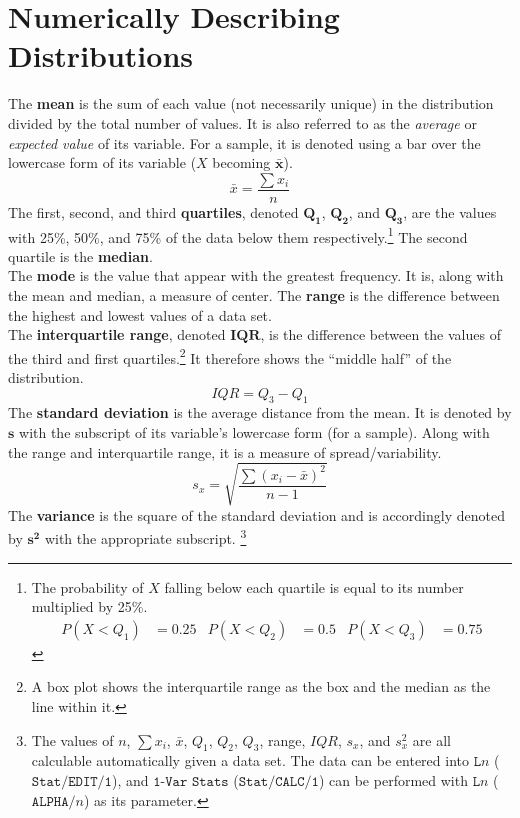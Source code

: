 \documentclass[../AP_Statistics.tex]{subfiles}
\begin{document}
		\section{Numerically Describing Distributions}
			The \textbf{mean} is the sum of each value (not necessarily unique) in the distribution divided by the total number of values. It is also referred to as the \emph{average} or \emph{expected value} of its variable. For a sample, it is denoted using a bar over the lowercase form of its variable ($X$ becoming $\pmb{\bar{x}}$).
			\[\bar{x} = \frac{\sum x_i}{n}\]
			The first, second, and third \textbf{quartiles}, denoted $\pmb{Q_1}$, $\pmb{Q_2}$, and $\pmb{Q_3}$, are the values with 25\%, 50\%, and 75\% of the data below them respectively.\footnote{The probability of $X$ falling below each quartile is equal to its number multiplied by 25\%. \begin{align*} P(X < Q_1) &= 0.25 & P(X < Q_2) &= 0.5 & P(X < Q_3) &= 0.75\end{align*}} The second quartile is the \textbf{median}. \\
			The \textbf{mode} is the value that appear with the greatest frequency. It is, along with the mean and median, a measure of center.
			The \textbf{range} is the difference between the highest and lowest values of a data set. \\
			The \textbf{interquartile range}, denoted $\pmb{IQR}$, is the difference between the values of the third and first quartiles.\footnote{A box plot shows the interquartile range as the box and the median as the line within it.} It therefore shows the \enquote{middle half} of the distribution.
			\[IQR = Q_3 - Q_1\]
			The \textbf{standard deviation} is the average distance from the mean. It is denoted by $\pmb{s}$  with the subscript of its variable's lowercase form (for a sample). Along with the range and interquartile range, it is a measure of spread/variability.
			\[s_x = \sqrt{\frac{\sum (x_i - \bar{x})^2}{n - 1}}\]
			The \textbf{variance} is the square of the standard deviation and is accordingly denoted by $\pmb{s^2}$ with the appropriate subscript. \footnote{The values of $n$, $\sum x_i$, $\bar{x}$, $Q_1$, $Q_2$, $Q_3$,  range, $IQR$, $s_x$, and $s_x^2$ are all calculable automatically given a data set. The data can be entered into $\texttt{L}n$ ($\texttt{Stat/EDIT/1}$), and $\texttt{1-Var Stats}$ ($\texttt{Stat/CALC/1}$) can be performed with $\texttt{L}n$ ($\texttt{ALPHA/}n$) as its parameter.} \\
\end{document}
